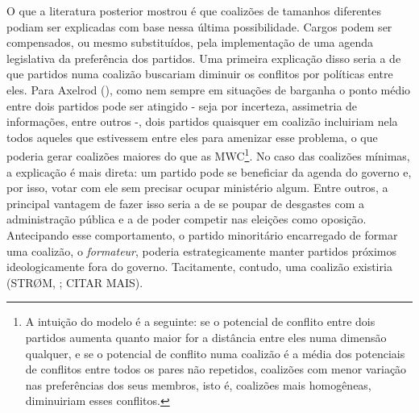 O que a literatura posterior mostrou é que coalizões de tamanhos diferentes podiam ser explicadas com base nessa última possibilidade. Cargos podem ser compensados, ou mesmo substituídos, pela implementação de uma agenda legislativa da preferência dos partidos. Uma primeira explicação disso seria a de que partidos numa coalizão buscariam diminuir os conflitos por políticas entre eles. Para Axelrod (\citeyear{axelrod1970}), como nem sempre em situações de barganha o ponto médio entre dois partidos pode ser atingido - seja por incerteza, assimetria de informações, entre outros -, dois partidos quaisquer em coalizão incluiriam nela todos aqueles que estivessem entre eles para amenizar esse problema, o que poderia gerar coalizões maiores do que as MWC\footnote{A intuição do modelo é a seguinte: se o potencial de conflito entre dois partidos aumenta quanto maior for a distância entre eles numa dimensão qualquer, e se o potencial de conflito numa coalizão é a média dos potenciais de conflitos entre todos os pares não repetidos, coalizões com menor variação nas preferências dos seus membros, isto é, coalizões mais homogêneas, diminuiriam esses conflitos.}. No caso das coalizões mínimas, a explicação é mais direta: um partido pode se beneficiar da agenda do governo e, por isso, votar com ele sem precisar ocupar ministério algum. Entre outros, a principal vantagem de fazer isso seria a de se poupar de desgastes com a administração pública e a de poder competir nas eleições como oposição. Antecipando esse comportamento, o partido minoritário encarregado de formar uma coalizão, o \textit{formateur}, poderia estrategicamente manter partidos próximos ideologicamente fora do governo. Tacitamente, contudo, uma coalizão existiria (STR\O{}M, \citeyear{strom1990}; CITAR MAIS).

